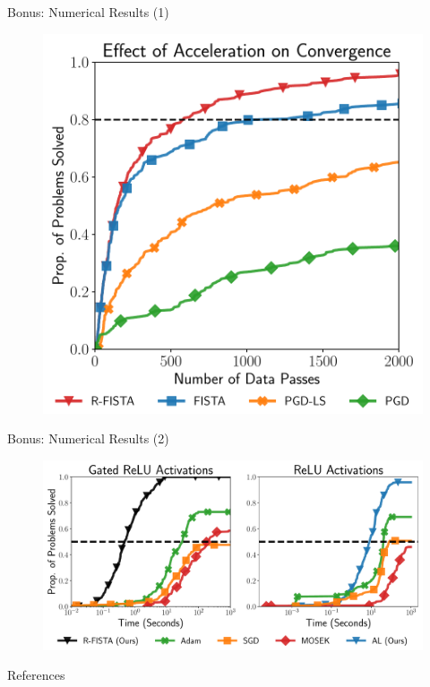 \documentclass[usenames,dvipsnames,mathserif,notheorems]{beamer}
\begin{document}
\begin{frame}{Bonus: Numerical Results (1)}
	\begin{figure}[t]
		\centering
		\includegraphics[width=0.75\linewidth]{figures/pp_acceleration.pdf}
	\end{figure}
\end{frame}

\begin{frame}{Bonus: Numerical Results (2)}
	\begin{figure}[t]
		\centering
		\includegraphics[width=1\linewidth]{figures/pp_main.pdf}
	\end{figure}
\end{frame}

\begin{frame}[allowframebreaks]{References}
	\printbibliography[]
\end{frame}
\end{document}
